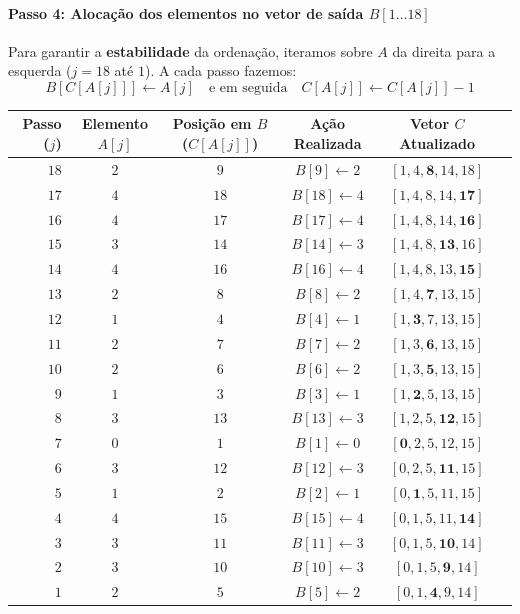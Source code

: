 \documentclass[11pt,a4paper]{article}
\begin{document}
\paragraph{Passo 4: Alocação dos elementos no vetor de saída $B[1 \dots 18]$}
Para garantir a \textbf{estabilidade} da ordenação, iteramos sobre $A$ da direita para a esquerda ($j = 18$ até $1$). A cada passo fazemos:
\[
B[C[A[j]]] \leftarrow A[j] \quad \text{e em seguida} \quad C[A[j]] \leftarrow C[A[j]] - 1
\]

\begin{center}
\small
\begin{tabular}{rccccc}
\toprule
\textbf{Passo ($j$)} & \textbf{Elemento $A[j]$} & \textbf{Posição em $B$ ($C[A[j]]$)} & \textbf{Ação Realizada} & \textbf{Vetor $C$ Atualizado} \\
\midrule
$18$ & $2$ & $9$  & $B[9] \leftarrow 2$  & $[1, 4, \mathbf{8}, 14, 18]$ \\
$17$ & $4$ & $18$ & $B[18] \leftarrow 4$ & $[1, 4, 8, 14, \mathbf{17}]$ \\
$16$ & $4$ & $17$ & $B[17] \leftarrow 4$ & $[1, 4, 8, 14, \mathbf{16}]$ \\
$15$ & $3$ & $14$ & $B[14] \leftarrow 3$ & $[1, 4, 8, \mathbf{13}, 16]$ \\
$14$ & $4$ & $16$ & $B[16] \leftarrow 4$ & $[1, 4, 8, 13, \mathbf{15}]$ \\
$13$ & $2$ & $8$  & $B[8] \leftarrow 2$  & $[1, 4, \mathbf{7}, 13, 15]$ \\
$12$ & $1$ & $4$  & $B[4] \leftarrow 1$  & $[1, \mathbf{3}, 7, 13, 15]$ \\
$11$ & $2$ & $7$  & $B[7] \leftarrow 2$  & $[1, 3, \mathbf{6}, 13, 15]$ \\
$10$ & $2$ & $6$  & $B[6] \leftarrow 2$  & $[1, 3, \mathbf{5}, 13, 15]$ \\
$9$  & $1$ & $3$  & $B[3] \leftarrow 1$  & $[1, \mathbf{2}, 5, 13, 15]$ \\
$8$  & $3$ & $13$ & $B[13] \leftarrow 3$ & $[1, 2, 5, \mathbf{12}, 15]$ \\
$7$  & $0$ & $1$  & $B[1] \leftarrow 0$  & $[\mathbf{0}, 2, 5, 12, 15]$ \\
$6$  & $3$ & $12$ & $B[12] \leftarrow 3$ & $[0, 2, 5, \mathbf{11}, 15]$ \\
$5$  & $1$ & $2$  & $B[2] \leftarrow 1$  & $[0, \mathbf{1}, 5, 11, 15]$ \\
$4$  & $4$ & $15$ & $B[15] \leftarrow 4$ & $[0, 1, 5, 11, \mathbf{14}]$ \\
$3$  & $3$ & $11$ & $B[11] \leftarrow 3$ & $[0, 1, 5, \mathbf{10}, 14]$ \\
$2$  & $3$ & $10$ & $B[10] \leftarrow 3$ & $[0, 1, 5, \mathbf{9}, 14]$ \\
$1$  & $2$ & $5$  & $B[5] \leftarrow 2$  & $[0, 1, \mathbf{4}, 9, 14]$ \\
\bottomrule
\end{tabular}
\end{center}
\end{document}
